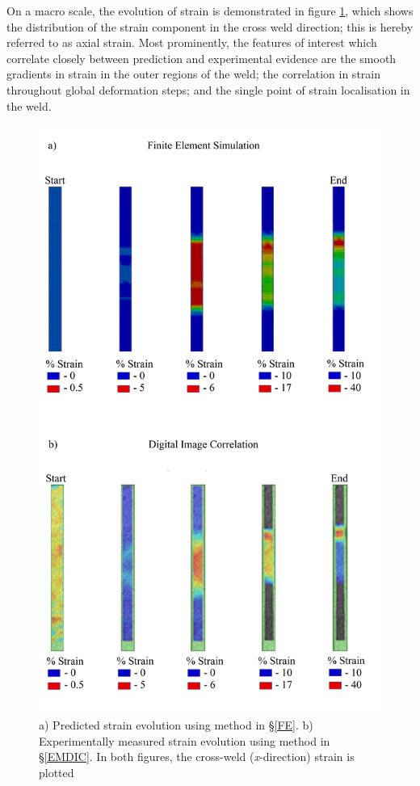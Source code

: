 On a macro scale, the evolution of strain is demonstrated in figure \ref{fig:UniaxialStrainMacro}, which shows the distribution of the strain component in the cross weld direction; this is hereby referred to as axial strain. Most prominently, the features of interest which correlate closely between prediction and experimental evidence are the  smooth gradients in strain in the outer regions of the weld; the correlation in strain throughout global deformation steps; and the single point of strain localisation in the weld. 
\begin{figure}
	\centering
	\includegraphics[width=0.7\linewidth]{MacroStrainPredict2}		
	\caption[Mesh]{a) Predicted strain evolution using method in \S\ref{FE}. b) Experimentally measured strain evolution using method in \S\ref{EMDIC}. In both figures, the cross-weld (\textit{x}-direction) strain is plotted}
	\label{fig:UniaxialStrainMacro}	
\end{figure} 
